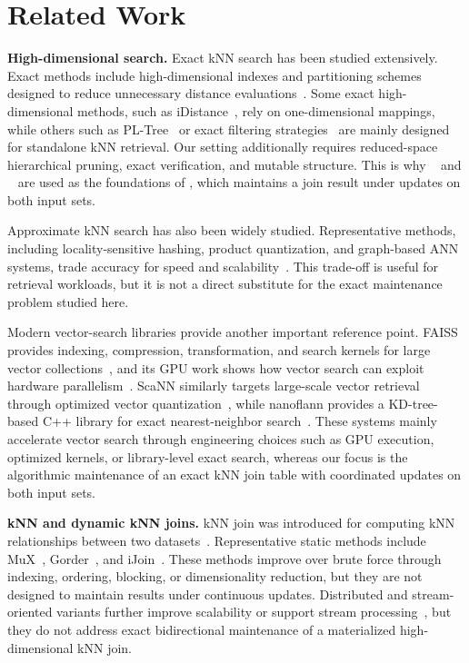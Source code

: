 \section{Related Work}\label{sec:related-works}

\noindent\textbf{High-dimensional search.}
Exact kNN search has been studied extensively. Exact methods include high-dimensional indexes and partitioning schemes designed to reduce unnecessary distance evaluations~\cite{yu2001indexing,cui2003contorting,cui2005indexing,garcia2010k,wang2013pl,xiao2016parallel,pan2020new,muhr2022hybrid}. Some exact high-dimensional methods, such as iDistance~\cite{jagadish2005idistance}, rely on one-dimensional mappings, while others such as PL-Tree~\cite{wang2013pl} or exact filtering strategies~\cite{pan2020new} are mainly designed for standalone kNN retrieval. Our setting additionally requires reduced-space hierarchical pruning, exact verification, and mutable structure. This is why \deltatree~\cite{cui2003contorting,cui2005indexing} and \hdrtree~\cite{yang2014continuous} are used as the foundations of \dualtree, which maintains a join result under updates on both input sets.

Approximate kNN search has also been widely studied. Representative methods, including locality-sensitive hashing, product quantization, and graph-based ANN systems, trade accuracy for speed and scalability~\cite{bawa2005lsh,jegou2010product,muja2014scalable,wang2019new,li2019approximate,song2020brepartition,gao2023high,zhao2023towards,chen2023finger}. This trade-off is useful for retrieval workloads, but it is not a direct substitute for the exact maintenance problem studied here.

Modern vector-search libraries provide another important reference point. FAISS provides indexing, compression, transformation, and search kernels for large vector collections~\cite{douze2026faiss}, and its GPU work shows how vector search can exploit hardware parallelism~\cite{johnson2021billion}. ScaNN similarly targets large-scale vector retrieval through optimized vector quantization~\cite{guo2020accelerating}, while nanoflann provides a KD-tree-based C++ library for exact nearest-neighbor search~\cite{blanco2014nanoflann}. These systems mainly accelerate vector search through engineering choices such as GPU execution, optimized kernels, or library-level exact search, whereas our focus is the algorithmic maintenance of an exact kNN join table with coordinated updates on both input sets.

\noindent\textbf{kNN and dynamic kNN joins.}
kNN join was introduced for computing kNN relationships between two datasets~\cite{bohm2003supporting,bohm2004k}. Representative static methods include MuX~\cite{bohm2001cost,bohm2004k}, Gorder~\cite{xia2004gorder}, and iJoin~\cite{yu2007efficient}. These methods improve over brute force through indexing, ordering, blocking, or dimensionality reduction, but they are not designed to maintain results under continuous updates. Distributed and stream-oriented variants further improve scalability or support stream processing~\cite{lu2012efficient,zhang2012efficient,zhao2017k,shahvarani2021distributed,bohm2006efficiently}, but they do not address exact bidirectional maintenance of a materialized high-dimensional kNN join.

